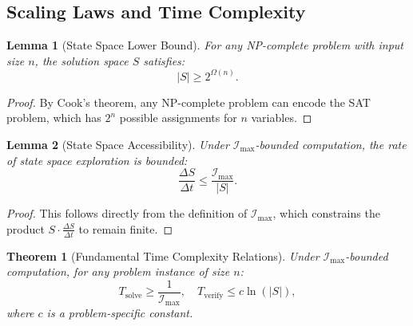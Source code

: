 \documentclass[12pt]{article}
\newtheorem{theorem}{Theorem}
\newtheorem{lemma}{Lemma}
\begin{document}
\subsection{Scaling Laws and Time Complexity}

\begin{lemma}[State Space Lower Bound]
For any NP-complete problem with input size \(n\), the solution space \(S\) satisfies:
\[
|S| \geq 2^{\Omega(n)}.
\]
\end{lemma}

\begin{proof}
By Cook’s theorem, any NP-complete problem can encode the SAT problem, which has \(2^n\) possible assignments for \(n\) variables.
\end{proof}

\begin{lemma}[State Space Accessibility]
Under \(\mathcal{I}_{\text{max}}\)-bounded computation, the rate of state space exploration is bounded:
\[
\frac{\Delta S}{\Delta t} \leq \frac{\mathcal{I}_{\text{max}}}{|S|}.
\]
\end{lemma}

\begin{proof}
This follows directly from the definition of \(\mathcal{I}_{\text{max}}\), which constrains the product \(S \cdot \frac{\Delta S}{\Delta t}\) to remain finite.
\end{proof}

\begin{theorem}[Fundamental Time Complexity Relations]
Under \(\mathcal{I}_{\text{max}}\)-bounded computation, for any problem instance of size \(n\):
\[
T_{\text{solve}} \geq \frac{1}{\mathcal{I}_{\text{max}}}, \quad T_{\text{verify}} \leq c\ln(|S|),
\]
where \(c\) is a problem-specific constant.
\end{theorem}
\end{document}
